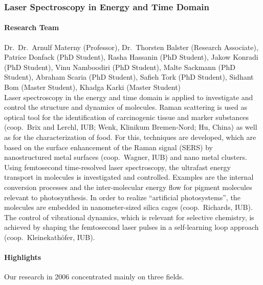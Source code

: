 
%

\subsubsection{Laser Spectroscopy in
Energy and Time Domain} 

\paragraph{Research Team}
Dr.\ Dr.\ Arnulf Materny (Professor), Dr.\ Thorsten Balster (Research Associate), Patrice Donfack (PhD Student), Rasha Hassanin (PhD Student), Jakow Konradi (PhD Student), Vinu Namboodiri (PhD Student), Malte Sackmann (PhD Student), Abraham Scaria (PhD Student), Safieh Tork (PhD Student), Sidhant Bom (Master Student), Khadga Karki (Master Student)\\

Laser spectroscopy in the energy and time domain is applied to
investigate and control the structure and dynamics of molecules. Raman scattering is used as optical tool for the identification of carcinogenic tissue and marker substances (coop.\ Brix and Lerchl, IUB; Wenk, Klinikum Bremen-Nord; Hu, China) as well as for the characterization of food. For this, techniques are developed, which are based on the surface enhancement of the Raman signal (SERS) by nanostructured metal surfaces (coop.\ Wagner, IUB) and nano metal clusters. Using femtosecond time-resolved laser spectroscopy, the ultrafast energy transport in molecules is investigated and controlled. Examples are the internal conversion processes and the inter-molecular energy flow for pigment molecules relevant to photosynthesis. In order to realize ``artificial photosystems'', the molecules are embedded in nanometer-sized silica cages (coop.\ Richards, IUB). The control of vibrational dynamics, which is relevant for selective chemistry, is achieved by shaping the femtosecond laser pulses in a self-learning loop approach (coop.\ Kleinekath\"{o}fer, IUB).



\paragraph{Highlights}

Our research in 2006 concentrated mainly on three fields.

